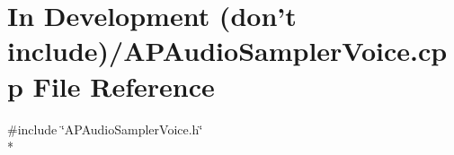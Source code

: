 \hypertarget{_in_01_development_01_07don't_01include_08_2_a_p_audio_sampler_voice_8cpp}{\section{In Development (don't include)/\+A\+P\+Audio\+Sampler\+Voice.cpp File Reference}
\label{_in_01_development_01_07don't_01include_08_2_a_p_audio_sampler_voice_8cpp}
}
{\ttfamily \#include \char`\"{}A\+P\+Audio\+Sampler\+Voice.\+h\char`\"{}}\\*
